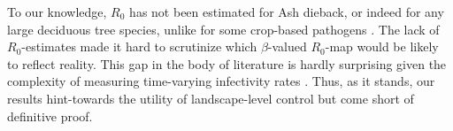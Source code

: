 
To our knowledge, $R_0$ has not been estimated for Ash dieback, or indeed for any large deciduous tree species, unlike for some crop-based pathogens \cite{segarra2001epidemic}. The lack of $R_0$-estimates made it hard to scrutinize which $\beta$-valued $R_0$-map would be likely to reflect reality. This gap in the body of literature is hardly surprising given the complexity of measuring time-varying infectivity rates \cite{13-challenges}. Thus, as it stands, our results hint-towards the utility of landscape-level control but come short of definitive proof.






